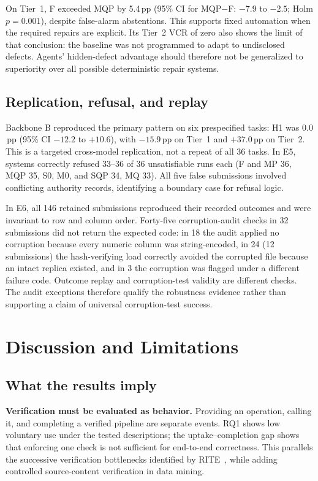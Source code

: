 \documentclass[conference]{IEEEtran}
\newcommand{\sys}[1]{\textsf{#1}}
\begin{document}
On Tier~1, \sys{F} exceeded \sys{MQP} by 5.4\,pp (95\% CI for \sys{MQP}$-$\sys{F}: $-7.9$ to $-2.5$; Holm $p=0.001$), despite false-alarm abstentions. This supports fixed automation when the required repairs are explicit. Its Tier~2 VCR of zero also shows the limit of that conclusion: the baseline was not programmed to adapt to undisclosed defects. Agents' hidden-defect advantage should therefore not be generalized to superiority over all possible deterministic repair systems.

\subsection{Replication, refusal, and replay}
Backbone B reproduced the primary pattern on six prespecified tasks: H1 was $0.0$\,pp (95\% CI $-12.2$ to $+10.6$), with $-15.9$\,pp on Tier~1 and $+37.0$\,pp on Tier~2. This is a targeted cross-model replication, not a repeat of all 36 tasks. In E5, systems correctly refused 33--36 of 36 unsatisfiable runs each (\sys{F} and \sys{MP} 36, \sys{MQP} 35, \sys{S0}, \sys{M0}, and \sys{SQP} 34, \sys{MQ} 33). All five false submissions involved conflicting authority records, identifying a boundary case for refusal logic.

In E6, all 146 retained submissions reproduced their recorded outcomes and were invariant to row and column order. Forty-five corruption-audit checks in 32 submissions did not return the expected code: in 18 the audit applied no corruption because every numeric column was string-encoded, in 24 (12 submissions) the hash-verifying load correctly avoided the corrupted file because an intact replica existed, and in 3 the corruption was flagged under a different failure code. Outcome replay and corruption-test validity are different checks. The audit exceptions therefore qualify the robustness evidence rather than supporting a claim of universal corruption-test success.

\section{Discussion and Limitations}
\label{sec:discussion}
\subsection{What the results imply}
\textbf{Verification must be evaluated as behavior.} Providing an operation, calling it, and completing a verified pipeline are separate events. RQ1 shows low voluntary use under the tested descriptions; the uptake--completion gap shows that enforcing one check is not sufficient for end-to-end correctness. This parallels the successive verification bottlenecks identified by RITE~\cite{zhang2026rite}, while adding controlled source-content verification in data mining.
\end{document}
